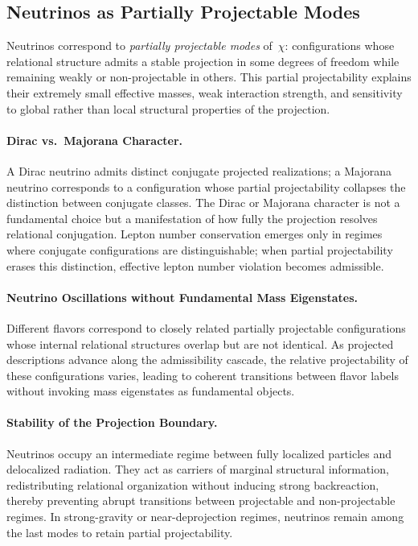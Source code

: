 \subsection{Neutrinos as Partially Projectable Modes}
\label{subsec:neutrinos-partially-projectable-modes}

Neutrinos correspond to \emph{partially projectable modes} of~$\chi$:
configurations whose relational structure admits a stable projection in
some degrees of freedom while remaining weakly or non-projectable in
others.
This partial projectability explains their extremely small effective
masses, weak interaction strength, and sensitivity to global rather than
local structural properties of the projection.

\paragraph{Dirac vs.\ Majorana Character.}
A Dirac neutrino admits distinct conjugate projected realizations; a
Majorana neutrino corresponds to a configuration whose partial
projectability collapses the distinction between conjugate classes.
The Dirac or Majorana character is not a fundamental choice but a
manifestation of how fully the projection resolves relational
conjugation.
Lepton number conservation emerges only in regimes where conjugate
configurations are distinguishable; when partial projectability erases
this distinction, effective lepton number violation becomes admissible.

\paragraph{Neutrino Oscillations without Fundamental Mass Eigenstates.}
\label{subsec:neutrino-oscillations-without-mass-eigenstates}
Different flavors correspond to closely related partially projectable
configurations whose internal relational structures overlap but are not
identical.
As projected descriptions advance along the admissibility cascade,
the relative projectability of these configurations varies, leading to
coherent transitions between flavor labels without invoking mass
eigenstates as fundamental objects.

\paragraph{Stability of the Projection Boundary.}
\label{subsec:neutrinos-and-projection-boundary-stability}
Neutrinos occupy an intermediate regime between fully localized particles
and delocalized radiation.
They act as carriers of marginal structural information, redistributing
relational organization without inducing strong backreaction, thereby
preventing abrupt transitions between projectable and non-projectable
regimes.
In strong-gravity or near-deprojection regimes, neutrinos remain among
the last modes to retain partial projectability.

